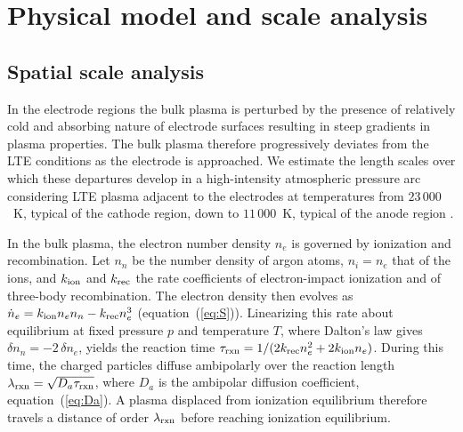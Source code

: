 \section{Physical model and scale analysis}
\label{sec:model}

\subsection{Spatial scale analysis}
\label{sec:scales involved}

In the electrode regions the bulk plasma is perturbed by the presence of relatively cold and absorbing nature of electrode surfaces resulting in steep gradients in plasma properties. The bulk plasma therefore progressively deviates from the LTE conditions as the electrode is approached. We estimate the length scales over which these departures develop in a high-intensity atmospheric pressure arc considering LTE plasma adjacent to the electrodes at temperatures from \(23\,000\)~K, typical of the cathode region, down to \(11\,000\)~K, typical of the anode region \cite{Hsu1983,haddad1984temperature}.

In the bulk plasma, the electron number density \(n_e\) is governed by ionization and recombination. Let \(n_n\) be the number density of argon atoms, \(n_i=n_e\) that of the ions, and \(k_{\rm ion}\) and \(k_{\rm rec}\) the rate coefficients of electron-impact ionization and of three-body recombination. The electron density then evolves as \(\dot n_e=k_{\rm ion}n_en_n-k_{\rm rec}n_e^3\) (equation~(\ref{eq:S})). Linearizing this rate about equilibrium at fixed pressure \(p\) and temperature \(T\), where Dalton's law gives \(\delta n_n=-2\,\delta n_e\), yields the reaction time \(\tau_{\rm rxn}=1/(2k_{\rm rec}n_e^2+2k_{\rm ion}n_e)\). During this time, the charged particles diffuse ambipolarly over the reaction length \(\lambda_{\rm rxn}=\sqrt{D_a\tau_{\rm rxn}}\), where \(D_a\) is the ambipolar diffusion coefficient, equation~(\ref{eq:Da}). A plasma displaced from ionization equilibrium therefore travels a distance of order \(\lambda_{\rm rxn}\) before reaching ionization equilibrium.

